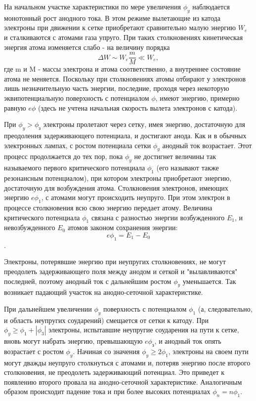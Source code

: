 На начальном участке характеристики по мере увеличения $\phi_y$ наблюдается монотонный рост анодного тока. В этом режиме вылетающие из катода электроны при движении к сетке приобретают сравнительно малую энергию $W_e$ и сталкиваются с атомами газа упруго. При таких столкновениях кинетическая энергия атома изменяется слабо - на величину порядка $$\Delta W\sim W_e\frac{m}{M}\ll W_e,$$ где m и M - массы электрона и атома соответственно, а внутреннее состояние атома не меняется. Поскольку при столкновениях атомы отбирают у электронов лишь незначительную часть энергии, последние, проходя через некоторую эквипотенциальную поверхность с потенциалом $\phi$, имеют энергию, примерно равную $e\phi$ (здесь не учтена начальная скорость вылета электронов с катода).

При $\phi_{y} > \phi_{з}$ электроны пролетают через сетку, имея энергию, достаточную для преодоления 
задерживающего потенциала, и достигают анода. Как и в обычных электронных лампах, с ростом потенциала сетки $\phi_{y}$ анодный
 ток возрастает. Этот процесс продолжается до тех пор, пока $\phi_{y}$ не достигнет величины
так называемого первого критического потенциала $\phi_{1}$ (его называют также резонансным потенциалом), при котором электроны 
приобретают энергию, достаточную для возбуждения атома. Столкновения электронов, имеющих энергию $e\phi_{1}$, с атомами могут 
происходить неупруго. При этом электрон в процессе столкновения всю свою энергию передает атому. Величина критического
потенциала $\phi_{1}$ связана с разностью энергии возбужденного 
$E_1$, и невозбужденного $E_0$ атомов законом сохранения энергии: $$e\phi_{1}=E_1-E_0$$.

Электроны, потерявшие энергию при неупругих столкновениях, не могут преодолеть задерживающего поля между анодом и сеткой
и "вылавливаются" последней, поэтому анодный ток с дальнейшим ростом 
$\phi_{y}$ уменьшается. Так возникает падающий участок на анодно-сеточной характеристике.

При дальнейшем увеличении $\phi_{y}$ поверхность с потенциалом $\phi_{1}$ (а, следовательно, и область неупругих
соударений) смещается от сетки к катоду. При $\phi_{y} \geqslant \phi_{1}+|\phi_{3}|$ электроны, испытавшие
неупругие соударения на пути к сетке, вновь могут набрать энергию, превышающую $e\phi_{з}$, и анодный ток опять
возрастает с ростом $\phi_{y}$. Начиная со значения $\phi_{y}\geqslant2\phi_{1}$, электроны на своем пути могут дважды неупруго столкнуться с атомами и, потеряв энергию после второго столкновения, не преодолеть задерживающий потенциал. Это приведет к появлению второго провала на анодно-сеточной характеристике. Аналогичным образом происходит падение тока и при более высоких потенциалах $\phi_{n}=n\phi_{1}$.



